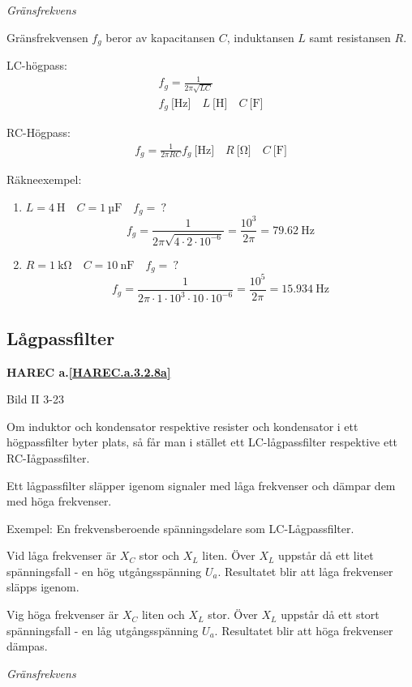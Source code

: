 \emph{Gränsfrekvens}

Gränsfrekvensen \(f_g\) beror av kapacitansen \(C\), induktansen \(L\) samt
resistansen \(R\).

LC-högpass:
\begin{gather*}
  f_g = \frac{1}{2π\sqrt{LC}} \\
  f_g\ \text{[Hz]} \quad L\ \text{[H]} \quad C\ \text{[F]}
\end{gather*}

RC-Högpass:
\begin{gather*}
  f_g = \frac{1}{2πRC}
  f_g\ \text{[Hz]} \quad R\ \text{[Ω]} \quad C\ \text{[F]}
\end{gather*}

Räkneexempel:
\begin{enumerate}
\item \(L = 4\ \text{H} \quad C = 1\ \text{µF} \quad f_g =\ ?\)
  \[
  f_g = \frac{1}{2π\sqrt{4\cdot 2 \cdot 10^{-6}}} = \frac{10^3}{2π}
  = 79.62\ \text{Hz}
  \]
\item \(R = 1\ \text{kΩ} \quad C = 10\ \text{nF} \quad f_g =\ ?\)
  \[
    f_g = \frac{1}{2π \cdot 1 \cdot 10^3 \cdot 10 \cdot 10^{-6}}
    = \frac{10^5}{2π} = 15.934\ \text{Hz}
  \]
\end{enumerate}

\subsection{Lågpassfilter}
\textbf{HAREC a.\ref{HAREC.a.3.2.8a}\label{myHAREC.a.3.2.8a}}

Bild II 3-23

Om induktor och kondensator respektive resister och kondensator i ett
högpassfilter byter plats, så får man i stället ett LC-lågpassfilter respektive
ett RC-Iågpassfilter.

Ett lågpassfilter släpper igenom signaler med låga frekvenser och dämpar dem med
höga frekvenser.

Exempel: En frekvensberoende spänningsdelare som LC-Lågpassfilter.

Vid låga frekvenser är \(X_C\) stor och \(X_L\) liten. Över \(X_L\) uppstår då
ett litet spänningsfall - en hög utgångsspänning \(U_a\). Resultatet blir att
låga frekvenser släpps igenom.

Vig höga frekvenser är \(X_C\) liten och \(X_L\) stor. Över \(X_L\) uppstår då
ett stort spänningsfall - en låg utgångsspänning \(U_a\). Resultatet blir att
höga frekvenser dämpas.

\emph{Gränsfrekvens}

